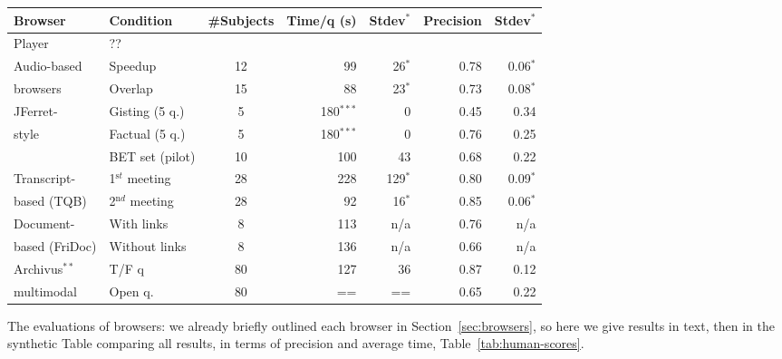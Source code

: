 \documentclass[11pt]{article}
\begin{document}
\begin{table*}
\begin{center}
\begin{tabular}{|ll|c|rr|rr|}
\hline 
\bf Browser & \bf Condition & \bf \#Subjects & \bf Time/q (s) & \bf Stdev$^*$ & \bf Precision & \bf Stdev$^*$ \\ 
\hline
Player & ??				& & & & & \\
\hline
Audio-based & Speedup 									& 12 & 99  & 26$^*$  & 0.78 & 0.06$^*$ \\
browsers & Overlap 											& 15 & 88  & 23$^*$  & 0.73 & 0.08$^*$ \\ 
\hline
JFerret- & Gisting (5 q.) 							& 5  & 180$^{***}$ &0 &0.45 & 0.34 \\
style    & Factual (5 q.) 						  & 5  & 180$^{***}$ &0 &0.76 & 0.25 \\
  			 & BET set (pilot)							& 10 & 100 & 43      & 0.68 & 0.22 \\
\hline
Transcript- & 1$^{\mathrm st}$ meeting 	& 28 & 228 & 129$^*$ & 0.80 & 0.09$^*$ \\  %
based (TQB) & 2$^{\mathrm nd}$ meeting	& 28 & 92  & 16$^*$  & 0.85 & 0.06$^*$ \\  %
\hline
Document- & With links 									& 8  & 113 & n/a     & 0.76 & n/a \\
based (FriDoc) & Without links  				& 8  & 136 & n/a     & 0.66 & n/a \\
\hline
Archivus$^{**}$ & T/F q								 	& 80 & 127 & 36      & 0.87 & 0.12 \\
multimodal &	Open q.\									& 80 & ==  & ==      & 0.65 & 0.22 \\
\hline
\end{tabular}
\end{center}
\caption{\label{tab:human-scores} Comparative results of several meeting browsers.  Average time needed by subjects to answer a question, and average precision.  STDs (or CIs at 95\% when marked with a $^*$) are in absolute values (of precision or time).  Put numbered notes to explain many differences.}
\end{table*}


The evaluations of browsers: we already briefly outlined each browser in Section~\ref{sec:browsers}, so here we give results in text, then in the synthetic Table comparing all results, in terms of precision and average time, Table~\ref{tab:human-scores}.
\end{document}
